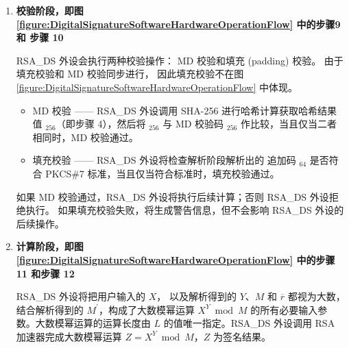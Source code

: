 \documentclass[main\_\_CN.tex]{subfiles}
\begin{document}
\begin{enumerate}
    \item {\bfseries 校验阶段，即图 \ref{figure:DigitalSignatureSoftwareHardwareOperationFlow} 中的步骤9 和 步骤 10}

        RSA\_DS 外设会执行两种校验操作： MD 校验和填充 (padding) 校验。
        由于填充校验和 MD 校验同步进行， 因此填充校验不在图 \ref{figure:DigitalSignatureSoftwareHardwareOperationFlow} 中体现。


        \begin{itemize}

            \item MD 校验 —— RSA\_DS 外设调用 SHA-256 进行哈希计算获取哈希结果值 \begin{math}[CALC\_MD]_{256}\end{math}（即步骤 4），然后将 \begin{math}[CALC\_MD]_{256}\end{math} 与 MD 校验码 \begin{math}[MD]_{256}\end{math} 作比较，当且仅当二者相同时，MD 校验通过。

            \item 填充校验 —— RSA\_DS 外设将检查解析阶段解析出的 追加码 \begin{math}[\beta]_{64} \end{math} 是否符合 PKCS\#7 标准，当且仅当符合标准时，填充校验通过。

        \end{itemize}

        如果 MD 校验通过，RSA\_DS 外设将执行后续计算；否则 RSA\_DS 外设拒绝执行。
        如果填充校验失败，将生成警告信息，但不会影响 RSA\_DS 外设的后续操作。

    \item {\bfseries 计算阶段，即图 \ref{figure:DigitalSignatureSoftwareHardwareOperationFlow} 中的步骤 11 和步骤 12}

        RSA\_DS 外设将把用户输入的 \begin{math}X\end{math}，
        以及解析得到的 \begin{math}Y\end{math}、\begin{math}M\end{math} 和 \begin{math}\overline{r}\end{math} 都视为大数，结合解析得到的 \begin{math}M^{\prime}\end{math}，构成了大数模幂运算 \begin{math} X^{Y} \bmod M\end{math} 的所有必要输入参数。大数模幂运算的运算长度由 \begin{math}L\end{math} 的值唯一指定。RSA\_DS 外设调用 RSA 加速器完成大数模幂运算 \begin{math}Z = X^{Y} \bmod M\end{math}，\begin{math}Z\end{math} 为签名结果。

\end{enumerate}
\end{document}
